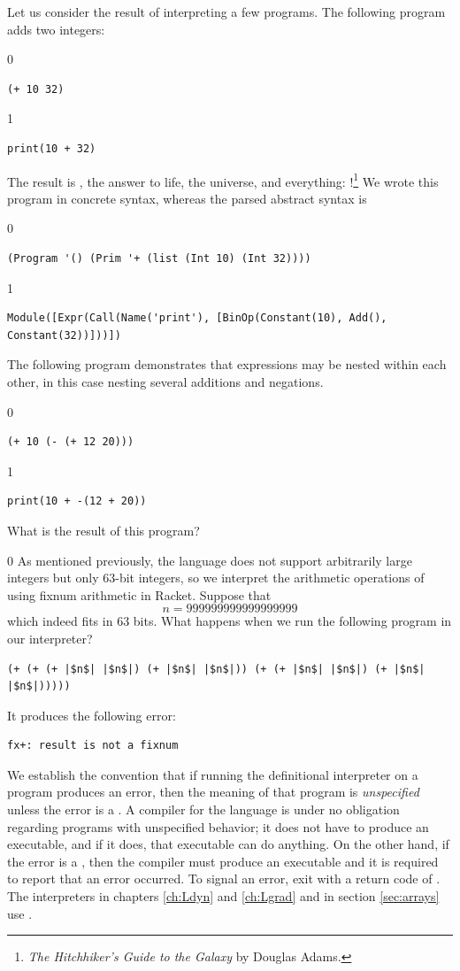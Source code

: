 \documentclass[7x10]{TimesAPriori_MIT}%
\def\racketEd{0}
\def\pythonEd{1}
\def\edition{1}
\newcommand{\pythonColor}[0]{}
\numberwithin{theorem}{chapter}
\numberwithin{definition}{chapter}
\numberwithin{equation}{chapter}
\begin{document}
Let us consider the result of interpreting a few \LangInt{} programs. The
following program adds two integers:
{\if\edition\racketEd
\begin{lstlisting}
(+ 10 32)
\end{lstlisting}
\fi}
{\if\edition\pythonEd\pythonColor
\begin{lstlisting}
print(10 + 32)
\end{lstlisting}
\fi}
%
\noindent The result is , the answer to life, the universe,
and everything: !\footnote{\emph{The Hitchhiker's Guide to
    the Galaxy} by Douglas Adams.}
%
We wrote this program in concrete syntax, whereas the parsed
abstract syntax is
{\if\edition\racketEd
\begin{lstlisting}
(Program '() (Prim '+ (list (Int 10) (Int 32))))
\end{lstlisting}
\fi}
{\if\edition\pythonEd\pythonColor
\begin{lstlisting}
Module([Expr(Call(Name('print'), [BinOp(Constant(10), Add(), Constant(32))]))])    
\end{lstlisting}
\fi}
The following program demonstrates that expressions may be nested within
each other, in this case nesting several additions and negations.
{\if\edition\racketEd
\begin{lstlisting}
(+ 10 (- (+ 12 20)))
\end{lstlisting}
\fi}
{\if\edition\pythonEd\pythonColor
\begin{lstlisting}
print(10 + -(12 + 20))
\end{lstlisting}
\fi}
%
\noindent What is the result of this program?

{\if\edition\racketEd
As mentioned previously, the \LangInt{} language does not support
arbitrarily large integers but only $63$-bit integers, so we
interpret the arithmetic operations of \LangInt{} using fixnum arithmetic
in Racket.
Suppose that
\[
  n = 999999999999999999
\]
which indeed fits in $63$ bits.  What happens when we run the
following program in our interpreter?
\begin{lstlisting}
(+ (+ (+ |$n$| |$n$|) (+ |$n$| |$n$|)) (+ (+ |$n$| |$n$|) (+ |$n$| |$n$|)))))
\end{lstlisting}
It produces the following error:
\begin{lstlisting}
fx+: result is not a fixnum
\end{lstlisting}
We establish the convention that if running the definitional
interpreter on a program produces an error, then the meaning of that
program is \emph{unspecified} unless the
error is a . A compiler for the language is under
no obligation regarding programs with unspecified behavior; it does
not have to produce an executable, and if it does, that executable can
do anything.  On the other hand, if the error is a
, then the compiler must produce an executable and
it is required to report that an error occurred. To signal an error,
exit with a return code of .  The interpreters in chapters
\ref{ch:Ldyn} and \ref{ch:Lgrad} and in section \ref{sec:arrays} use
.
\fi}
\end{document}
